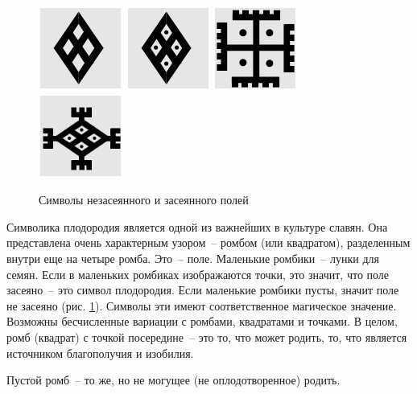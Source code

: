 \documentclass[pscyr,chapters]{hedwork}
\begin{document}
  \begin{figure}[ht]
    \center
    \includegraphics{sl_5_1} \hspace{1em}
    \includegraphics{sl_5_2} \hspace{1em}
    \includegraphics{sl_5_3} \hspace{1em}
    \includegraphics{sl_5_4}
    \caption{Символы незасеянного и засеянного полей}
    \label{pic-fields}
  \end{figure}

  Символика плодородия является одной из важнейших в культуре славян.
  Она представлена очень характерным
  узором~-- ромбом (или квадратом), разделенным внутри еще на четыре ромба.
  Это~-- поле. Маленькие ромбики~-- лунки для семян. Если в
  маленьких ромбиках изображаются точки, это значит, что поле засеяно~-- это
  символ плодородия. Если маленькие ромбики пусты, значит поле не засеяно
  (рис. \ref{pic-fields}). Символы эти имеют соответственное магическое
  значение. Возможны бесчисленные
  вариации с ромбами, квадратами и точками. В целом, ромб (квадрат) с точкой
  посередине~-- это то, что может родить, то, что является источником
  благополучия и изобилия.

  Пустой ромб~-- то же, но не могущее (не оплодотворенное) родить.
 
\end{document}
